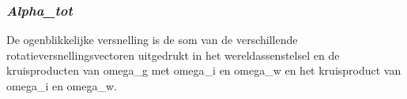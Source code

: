 \documentclass{article}
\begin{document}
\subsubsection{\textbf{\textit{Alpha\_tot}}}
\begin{maplelatex}\begin{Maple Normal}{
De ogenblikkelijke versnelling is de som van de verschillende rotatieversnellingsvectoren uitgedrukt in het wereldassenstelsel en de kruisproducten van omega\_g met omega\_i en omega\_w en het kruisproduct van omega\_i en omega\_w.}\end{Maple Normal}
\end{maplelatex}
\begin{maplegroup}
\begin{mapleinput}
\end{mapleinput}
\mapleresult
{}
\mapleresult
{}
\end{maplegroup}
\begin{maplegroup}
\begin{mapleinput}
\end{mapleinput}
\mapleresult
{}
\end{maplegroup}
\end{document}
